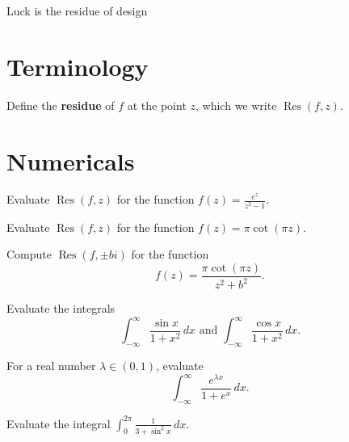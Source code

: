 \documentclass{homework}
\author{Jim Fowler}
\DeclareMathOperator{\Res}{Res}
\begin{document}
\maketitle

\begin{inspiration}
  Luck is the residue of design
\end{inspiration}

\section{Terminology}

\begin{problem}
  Define the \textbf{residue} of $f$ at the point $z$, which we write $\Res(f,z)$.
\end{problem}

\section{Numericals}

\begin{problem}
  Evaluate $\Res(f,z)$ for the function $f(z) = \displaystyle\frac{e^z}{z^2-1}$.
\end{problem}

\begin{problem}\label{residues-all-one}Evaluate $\Res(f,z)$ for the
  function $f(z) = \pi \cot (\pi z)$.
\end{problem}

\begin{problem}\label{residue-coth}Compute $\Res(f,\pm bi)$ for the
  function
  \[
    f(z) = \frac{\pi \cot(\pi z)}{z^2 + b^2}.
  \]
\end{problem}

\begin{problem}
  Evaluate the integrals
  \[
    \int_{-\infty}^\infty \frac{\sin x}{1+x^2} \, dx \mbox{ and }
    \int_{-\infty}^\infty \frac{\cos x}{1+x^2} \, dx.
  \]
\end{problem}

\begin{problem}\label{integral-for-euler-reflection}For a real number
  $\lambda \in (0,1)$, evaluate
  \[
    \int_{-\infty}^\infty \frac{e^{\lambda x}}{1 + e^x} \, dx.
  \]
\end{problem}

\begin{problem}
  Evaluate the integral $\displaystyle\int_{0}^{2\pi} \frac{1}{3 + \sin^2 x} \, dx$.
\end{problem}
\end{document}
